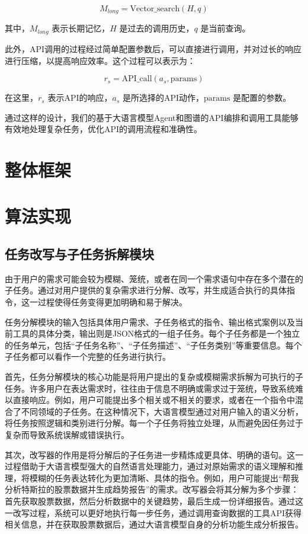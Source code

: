 \[
M_{long} = \text{Vector\_search}(H, q) \tag{5}
\]

其中，\( M_{long} \) 表示长期记忆，\( H \) 是过去的调用历史，\( q \) 是当前查询。

此外，API调用的过程经过简单配置参数后，可以直接进行调用，并对过长的响应进行压缩，以提高响应效率。这个过程可以表示为：

\[
r_s = \text{API\_call}(a_s, \text{params}) \tag{6}
\]

在这里，\( r_s \) 表示API的响应，\( a_s \) 是所选择的API动作，\(\text{params}\) 是配置的参数。

通过这样的设计，我们的基于大语言模型Agent和图谱的API编排和调用工具能够有效地处理复杂任务，优化API的调用流程和准确性。

\section{整体框架}



\section{算法实现}

\subsection{任务改写与子任务拆解模块}

由于用户的需求可能会较为模糊、笼统，或者在同一个需求语句中存在多个潜在的子任务。通过对用户提供的复杂需求进行分解、改写，并生成适合执行的具体指令，这一过程使得任务变得更加明确和易于解决。

任务分解模块的输入包括具体用户需求、子任务格式的指令、输出格式案例以及当前工具的具体分类，输出则是JSON格式的一组子任务。每个子任务都是一个独立的任务单元，包括“子任务名称”、“子任务描述”、“子任务类别”等重要信息。每个子任务都可以看作一个完整的任务进行执行。

首先，任务分解模块的核心功能是将用户提出的复杂或模糊需求拆解为可执行的子任务。许多用户在表达需求时，往往由于信息不明确或需求过于笼统，导致系统难以直接响应。例如，用户可能提出多个相关或不相关的要求，或者在一个指令中混合了不同领域的子任务。在这种情况下，大语言模型通过对用户输入的语义分析，将任务按照逻辑和类别进行分解。每一个子任务将独立处理，从而避免因任务过于复杂而导致系统误解或错误执行。

其次，改写器的作用是将分解后的子任务进一步精炼成更具体、明确的语句。这一过程借助于大语言模型强大的自然语言处理能力，通过对原始需求的语义理解和推理，将模糊的任务表达转化为更加清晰、具体的指令。例如，用户可能提出“帮我分析特斯拉的股票数据并生成趋势报告”的需求。改写器会将其分解为多个步骤：首先获取股票数据，然后分析数据中的关键趋势，最后生成一份详细报告。通过这一改写过程，系统可以更好地执行每一步任务，通过调用查询数据的工具API获得相关信息，并在获取股票数据后，通过大语言模型自身的分析功能生成分析报告。

